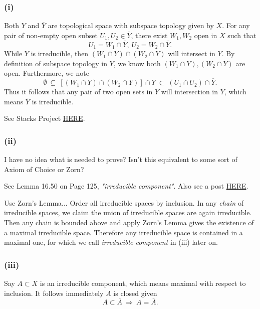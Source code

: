 \subsubsection{(i)}
Both $Y$ and $\overline{Y}$ are topological space with subspace topology given by $X$.
For any pair of non-empty open subset $U_1,U_2\in\overline{Y}$, there exist $W_1,W_2$ open in $X$ such that $$U_1=W_1\cap\overline{Y},~ U_2=W_2\cap\overline{Y}.$$
While $Y$ is irreducible, then $(W_1\cap Y)\cap (W_2\cap Y)$ will intersect in $Y$. By definition of subspace topology in $Y$, we know both $(W_1\cap Y),(W_2\cap Y)$ are open. Furthermore, we note
$$\emptyset~\subsetneq~[(W_1\cap Y)\cap(W_2\cap Y)]\cap Y ~\subset~ (U_1\cap U_2)\cap \overline{Y}.$$ Thus it follows that any pair of two open sets in $\overline{Y}$ will intersection in $\overline{Y}$, which means $\overline{Y}$ is irreducible.

See Stacks Project \href{https://stacks.math.columbia.edu/tag/004U}{HERE}.

\subsubsection{(ii)}

I have no idea what is needed to prove? Isn't this equivalent to some sort of Axiom of Choice or Zorn?

See \cite{altman} Lemma 16.50 on Page 125, \textit{"irreducible component"}. Also see a post \href{https://math.stackexchange.com/questions/1809159/show-every-irreducible-subset-of-a-topological-space-x-is-contained-in-a-maxim}{HERE}.

Use Zorn's Lemma... 
Order all irreducible spaces by inclusion. In any \textit{chain} of irreducible spaces, we claim the union of irreducible spaces are again irreducible. Then any chain is bounded above and apply Zorn's Lemma gives the existence of a maximal irreducible space. Therefore any irreducible space is contained in a maximal one, for which we call \textit{irreducible component} in (iii) later on.

\subsubsection{(iii)}

Say $A\subset X$ is an irreducible component, which means maximal with respect to inclusion. It follows immediately $A$ is closed given $$A\subset \overline{A} ~\Rightarrow~ A=\overline{A}.$$

